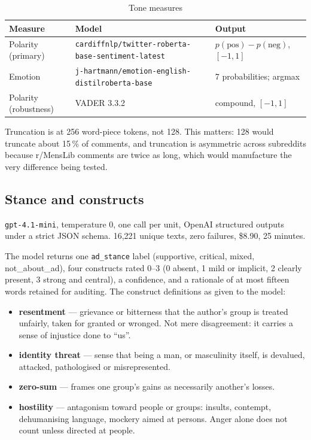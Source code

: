 \documentclass[11pt,a4paper]{article}
\newcommand{\code}[1]{\texttt{\small #1}}
\begin{document}
\begin{table}[h]
\centering\small
\caption{Tone measures}
\begin{tabular}{lll}
\toprule
Measure & Model & Output \\
\midrule
Polarity (primary)    & \code{cardiffnlp/twitter-roberta-base-sentiment-latest} & $p(\text{pos})-p(\text{neg})$, $[-1,1]$ \\
Emotion               & \code{j-hartmann/emotion-english-distilroberta-base}    & 7 probabilities; argmax \\
Polarity (robustness) & VADER 3.3.2                                             & compound, $[-1,1]$ \\
\bottomrule
\end{tabular}
\end{table}

Truncation is at 256 word-piece tokens, not 128. This matters: 128 would truncate about 15\,\% of
comments, and truncation is asymmetric across subreddits because r/MensLib comments are twice as
long, which would manufacture the very difference being tested.

\subsection{Stance and constructs}

\code{gpt-4.1-mini}, temperature 0, one call per unit, OpenAI structured outputs under a strict JSON
schema. 16{,}221 unique texts, zero failures, \$8.90, 25 minutes.

The model returns one \code{ad\_stance} label (supportive, critical, mixed, not\_about\_ad), four
constructs rated 0--3 (0 absent, 1 mild or implicit, 2 clearly present, 3 strong and central), a
confidence, and a rationale of at most fifteen words retained for auditing. The construct
definitions as given to the model:

\begin{itemize}
\item \textbf{resentment} --- grievance or bitterness that the author's group is treated unfairly,
taken for granted or wronged. Not mere disagreement: it carries a sense of injustice done to ``us''.
\item \textbf{identity threat} --- sense that being a man, or masculinity itself, is devalued,
attacked, pathologised or misrepresented.
\item \textbf{zero-sum} --- frames one group's gains as necessarily another's losses.
\item \textbf{hostility} --- antagonism toward people or groups: insults, contempt, dehumanising
language, mockery aimed at persons. Anger alone does not count unless directed at people.
\end{itemize}
\end{document}
